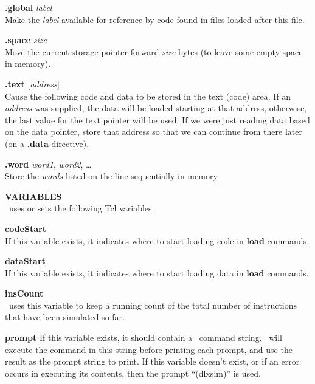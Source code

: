 \begin{mylist}
\begin{mylist}
\item[{\bf .global} {\em label}]
\nopagebreak \hfill \\
Make the {\em label} available for reference by code found in files
loaded after this file.

\item[{\bf .space} {\em size}]
\nopagebreak \hfill \\
Move the current storage pointer forward {\em size} bytes (to leave some
empty space in memory).

\item[{\bf .text} {[}{\em address}{]}]
\nopagebreak \hfill \\
Cause the following code and data to be stored in the text (code)
area.  If an {\em address} was supplied, the data will be loaded
starting at that address, otherwise, the last value for the text
pointer will be used.  If we were just reading data based on the data
pointer, store that address so that we can continue from there later
(on a {\bf .data} directive).

\item[{\bf .word} {\em word1}, {\em word2}, \ldots]
\nopagebreak \hfill \\
Store the {\em words} listed on the line sequentially in memory.

\end{mylist}

\item[{\bf VARIABLES}]
\nopagebreak \hfill \\
\dlxsim\ uses or sets the following Tcl variables:

\begin{mylist}
\item[{\bf codeStart}]
\nopagebreak \hfill \\
If this variable exists, it indicates where to start loading code in
{\bf load} commands.

\item[{\bf dataStart}]
\nopagebreak \hfill \\
If this variable exists, it indicates where to start loading data in
{\bf load} commands.

\item[{\bf insCount}]
\nopagebreak \hfill \\
\dlxsim\ uses this variable to keep a running count of the total number
of instructions that have been simulated so far.

\item[{\bf prompt}\hfill]
If this variable exists, it should contain a \dlxsim\ command string.
\dlxsim\ will execute the command in this string before printing each
prompt, and use the result as the prompt string to print.  If this
variable doesn't exist, or if an error occurs in executing its
contents, then the prompt ``(dlxsim)'' is used.
\end{mylist}


\end{mylist}
